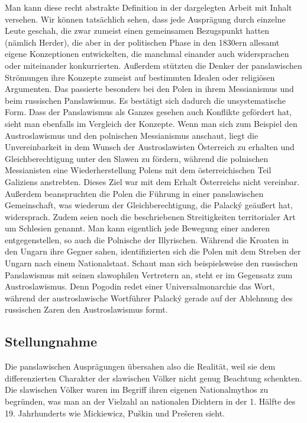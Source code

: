 \documentclass[12pt,headsepline,a4paper]{scrartcl}
\begin{document}
Man kann diese recht abstrakte Definition in der dargelegten Arbeit mit Inhalt versehen. Wir
können tatsächlich sehen, dass jede Ausprägung durch einzelne Leute geschah, die zwar
zumeist einen gemeinsamen Bezugspunkt hatten (nämlich Herder), die aber in der politischen
Phase in den 1830ern allesamt eigene Konzeptionen entwickelten, die manchmal einander
auch widersprachen oder miteinander konkurrierten. Außerdem stützten die Denker der
panslawischen Strömungen ihre Konzepte zumeist auf bestimmten Idealen oder religiösen
Argumenten. Das passierte besonders bei den Polen in ihrem Messianismus und beim
russischen Panslawismus. Es bestätigt sich dadurch die unsystematische Form.
Dass der Panslawismus als Ganzes gesehen auch Konflikte gefördert hat, sieht man ebenfalls
im Vergleich der Konzepte. Wenn man sich zum Beispiel den Austroslawismus und den
polnischen Messianismus anschaut, liegt die Unvereinbarkeit in dem Wunsch der
Austroslawisten Österreich zu erhalten und Gleichberechtigung unter den Slawen zu fördern,
während die polnischen Messianisten eine Wiederherstellung Polens mit dem österreichischen
Teil Galiziens anstrebten. Dieses Ziel war mit dem Erhalt Österreichs nicht vereinbar.
Außerdem beanspruchten die Polen die Führung in einer panslawischen Gemeinschaft, was
wiederum der Gleichberechtigung, die Palacký geäußert hat, widersprach. Zudem seien noch
die beschriebenen Streitigkeiten territorialer Art um Schlesien genannt.
Man kann eigentlich jede Bewegung einer anderen entgegenstellen, so auch die Polnische der
Illyrischen. Während die Kroaten in den Ungarn ihre Gegner sahen, identifizierten sich die
Polen mit dem Streben der Ungarn nach einem Nationalstaat. Schaut man sich beispielsweise
den russischen Panslawismus mit seinen slawophilen Vertretern an, steht er im Gegensatz zum
Austroslawismus. Denn Pogodin redet einer Universalmonarchie das Wort, während der
austroslawische Wortführer Palacký gerade auf der Ablehnung des russischen Zaren den
Austroslawismus formt.
\subsection*{Stellungnahme}
Die panslawischen Ausprägungen übersahen also die Realität, weil sie dem differenzierten
Charakter der slawischen Völker nicht genug Beachtung schenkten. Die slawischen Völker
waren im Begriff ihren eigenen Nationalmythos zu begründen, was man an der Vielzahl an
nationalen Dichtern in der 1. Hälfte des 19. Jahrhunderts wie Mickiewicz, Puškin und
Prešeren sieht.
\end{document}
